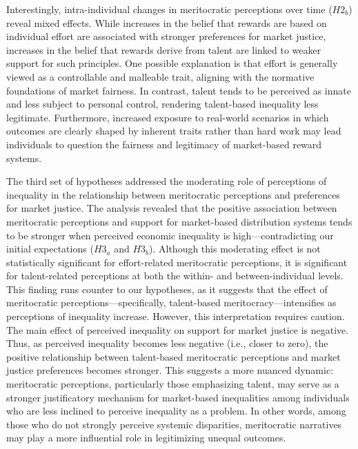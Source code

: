 \documentclass[
  12pt,
]{article}
\begin{document}
Interestingly, intra-individual changes in meritocratic perceptions over
time (\(H2_{b}\)) reveal mixed effects. While increases in the belief
that rewards are based on individual effort are associated with stronger
preferences for market justice, increases in the belief that rewards
derive from talent are linked to weaker support for such principles. One
possible explanation is that effort is generally viewed as a
controllable and malleable trait, aligning with the normative
foundations of market fairness. In contrast, talent tends to be
perceived as innate and less subject to personal control, rendering
talent-based inequality less legitimate. Furthermore, increased exposure
to real-world scenarios in which outcomes are clearly shaped by inherent
traits rather than hard work may lead individuals to question the
fairness and legitimacy of market-based reward systems.

The third set of hypotheses addressed the moderating role of perceptions
of inequality in the relationship between meritocratic perceptions and
preferences for market justice. The analysis revealed that the positive
association between meritocratic perceptions and support for
market-based distribution systems tends to be stronger when perceived
economic inequality is high---contradicting our initial expectations
(\(H3_{a}\) and \(H3_{b}\)). Although this moderating effect is not
statistically significant for effort-related meritocratic perceptions,
it is significant for talent-related perceptions at both the within- and
between-individual levels. This finding runs counter to our hypotheses,
as it suggests that the effect of meritocratic
perceptions---specifically, talent-based meritocracy---intensifies as
perceptions of inequality increase. However, this interpretation
requires caution. The main effect of perceived inequality on support for
market justice is negative. Thus, as perceived inequality becomes less
negative (i.e., closer to zero), the positive relationship between
talent-based meritocratic perceptions and market justice preferences
becomes stronger. This suggests a more nuanced dynamic: meritocratic
perceptions, particularly those emphasizing talent, may serve as a
stronger justificatory mechanism for market-based inequalities among
individuals who are less inclined to perceive inequality as a problem.
In other words, among those who do not strongly perceive systemic
disparities, meritocratic narratives may play a more influential role in
legitimizing unequal outcomes.
\end{document}
